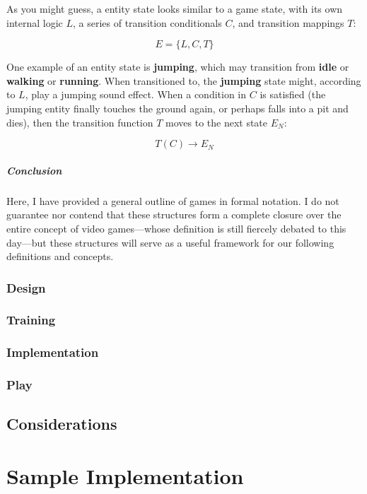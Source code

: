 \documentclass{report}
\begin{document}
As you might guess, a entity state looks similar to a game state, with its own internal logic $L$, a series of transition conditionals $C$, and transition mappings $T$:

$$E = \{L, C, T\}$$

One example of an entity state is \textbf{jumping}, which may transition from \textbf{idle} or \textbf{walking} or \textbf{running}. When transitioned to, the \textbf{jumping} state might, according to $L$, play a jumping sound effect. When a condition in $C$ is satisfied (the jumping entity finally touches the ground again, or perhaps falls into a pit and dies), then the transition function $T$ moves to the next state $E_N$:

$$T(C) \longrightarrow E_N$$


\paragraph{Conclusion}
Here, I have provided a general outline of games in formal notation. I do not guarantee nor contend that these structures form a complete closure over the entire concept of video games---whose definition is still fiercely debated to this day\cite{Knoop_2021}---but these structures will serve as a useful framework for our following definitions and concepts.

\subsection{Design}
\subsection{Training}
\subsection{Implementation}
\subsection{Play}
\section{Considerations}



\chapter{Sample Implementation}
\end{document}
